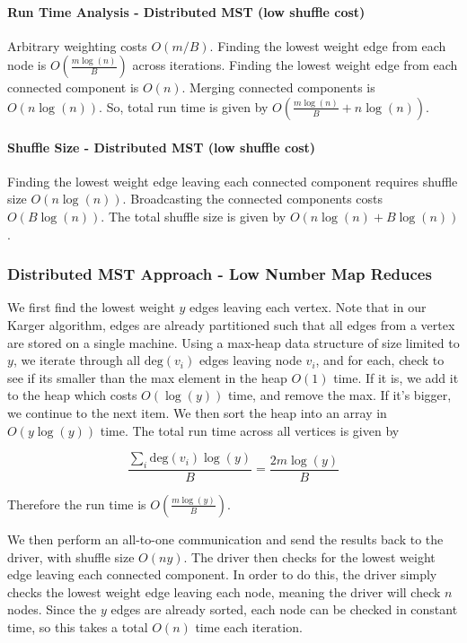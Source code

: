 \documentclass{article}
\begin{document}
\paragraph{Run Time Analysis - Distributed MST (low shuffle cost)}

Arbitrary weighting costs $O(m/B)$. Finding the lowest weight edge from each node is $O(\frac{m \log(n)}{B})$ across iterations. Finding the lowest weight edge from each connected component is $O(n)$. Merging connected components is $O(n \log(n))$. So, total run time is given by $O(\frac{m \log(n)}{B} + n \log(n))$.

\paragraph{Shuffle Size - Distributed MST (low shuffle cost)}

Finding the lowest weight edge leaving each connected component requires shuffle size $O(n \log(n))$. Broadcasting the connected components costs $O(B \log(n))$. The total shuffle size is given by $O(n\log(n) + B \log(n))$.


\subsubsection{Distributed MST Approach - Low Number Map Reduces}

We first find the lowest weight $y$ edges leaving each vertex. Note that in our Karger algorithm, edges are already partitioned such that all edges from a vertex are stored on a single machine. Using a max-heap data structure of size limited to $y$, we iterate through all $\text{deg}(v_i)$ edges leaving node $v_i$, and for each, check to see if its smaller than the max element in the heap $O(1)$ time. If it is, we add it to the heap which costs $O(\log(y))$ time, and remove the max. If it's bigger, we continue to the next item. We then sort the heap into an array in $O(y\log(y))$ time. The total run time across all vertices is given by

\[
\frac{\sum_{i} \text{deg}(v_i) \log(y)}{B} = \frac{2m \log(y)}{B}
\]

Therefore the run time is $O(\frac{m \log(y)}{B})$.

We then perform an all-to-one communication and send the results back to the driver, with shuffle size $O(n y)$. The driver then checks for the lowest weight edge leaving each connected component. In order to do this, the driver simply checks the lowest weight edge leaving each node, meaning the driver will check $n$ nodes. Since the $y$ edges are already sorted, each node can be checked in constant time, so this takes a total $O(n)$ time each iteration.
\end{document}
